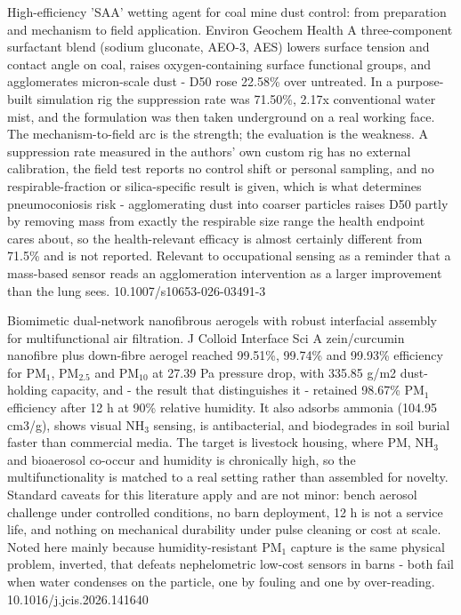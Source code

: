 \documentclass[10pt]{article}
\begin{document}
{High-efficiency 'SAA' wetting agent for coal mine dust control: from preparation and mechanism to field application.}
{Environ Geochem Health}
{A three-component surfactant blend (sodium gluconate, AEO-3, AES) lowers surface tension and contact angle on coal, raises oxygen-containing surface functional groups, and agglomerates micron-scale dust - D50 rose 22.58\% over untreated. In a purpose-built simulation rig the suppression rate was 71.50\%, 2.17x conventional water mist, and the formulation was then taken underground on a real working face. The mechanism-to-field arc is the strength; the evaluation is the weakness. A suppression rate measured in the authors' own custom rig has no external calibration, the field test reports no control shift or personal sampling, and no respirable-fraction or silica-specific result is given, which is what determines pneumoconiosis risk - agglomerating dust into coarser particles raises D50 partly by removing mass from exactly the respirable size range the health endpoint cares about, so the health-relevant efficacy is almost certainly different from 71.5\% and is not reported. Relevant to occupational sensing as a reminder that a mass-based sensor reads an agglomeration intervention as a larger improvement than the lung sees.}
{10.1007/s10653-026-03491-3}

{Biomimetic dual-network nanofibrous aerogels with robust interfacial assembly for multifunctional air filtration.}
{J Colloid Interface Sci}
{A zein/curcumin nanofibre plus down-fibre aerogel reached 99.51\%, 99.74\% and 99.93\% efficiency for PM$_{1}$, PM$_{2.5}$ and PM$_{10}$ at 27.39 Pa pressure drop, with 335.85 g/m2 dust-holding capacity, and - the result that distinguishes it - retained 98.67\% PM$_{1}$ efficiency after 12 h at 90\% relative humidity. It also adsorbs ammonia (104.95 cm3/g), shows visual NH$_3$ sensing, is antibacterial, and biodegrades in soil burial faster than commercial media. The target is livestock housing, where PM, NH$_3$ and bioaerosol co-occur and humidity is chronically high, so the multifunctionality is matched to a real setting rather than assembled for novelty. Standard caveats for this literature apply and are not minor: bench aerosol challenge under controlled conditions, no barn deployment, 12 h is not a service life, and nothing on mechanical durability under pulse cleaning or cost at scale. Noted here mainly because humidity-resistant PM$_{1}$ capture is the same physical problem, inverted, that defeats nephelometric low-cost sensors in barns - both fail when water condenses on the particle, one by fouling and one by over-reading.}
{10.1016/j.jcis.2026.141640}
\end{document}
